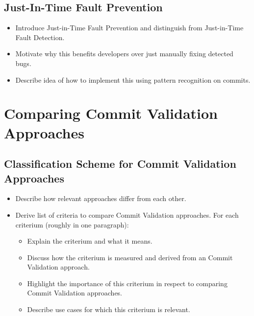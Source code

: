 \subsection{Just-In-Time Fault Prevention}
\begin{itemize}
	\item Introduce Just-in-Time Fault Prevention and distinguish from Just-in-Time Fault Detection.
	\item Motivate why this benefits developers over just manually fixing detected bugs.
	\item Describe idea of how to implement this using pattern recognition on commits.
\end{itemize}




\section{Comparing Commit Validation Approaches}

\subsection{Classification Scheme for Commit Validation Approaches}
\label{sec:scheme}
\begin{itemize}
	\item Describe how relevant approaches differ from each other.
	\item Derive list of criteria to compare Commit Validation approaches. For each criterium (roughly in one paragraph):
	\begin{itemize}
		\item Explain the criterium and what it means.
		\item Discuss how the criterium is measured and derived from an Commit Validation approach.
		\item Highlight the importance of this criterium in respect to comparing Commit Validation approaches.
		\item Describe use cases for which this criterium is relevant.
	\end{itemize}
	
\end{itemize}

